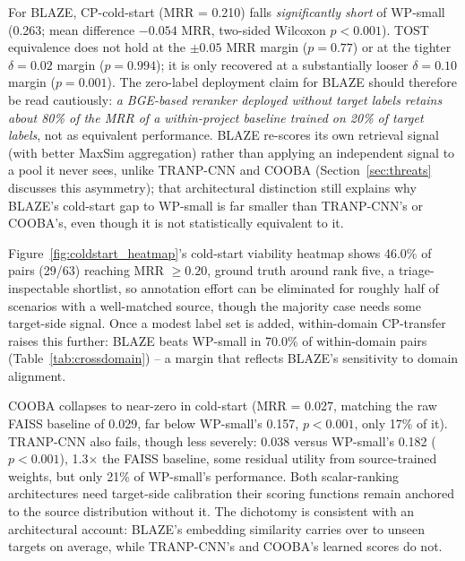 \documentclass[a4paper,fleqn]{cas-dc}
\begin{document}
For BLAZE, CP-cold-start (MRR = 0.210) falls \emph{significantly short}
of WP-small (0.263; mean
difference $-0.054$ MRR, two-sided Wilcoxon $p < 0.001$). TOST equivalence
does not hold at the $\pm 0.05$ MRR margin ($p = 0.77$) or at the tighter $\delta = 0.02$ margin
($p = 0.994$); it is only recovered at a substantially looser
$\delta = 0.10$ margin ($p = 0.001$). The zero-label deployment claim for
BLAZE should therefore be read cautiously:
\emph{a BGE-based reranker deployed without
target labels retains about 80\% of the MRR of a within-project baseline
trained on 20\% of target labels}, not as equivalent performance. BLAZE re-scores
its own retrieval signal (with better MaxSim aggregation) rather than
applying an independent signal to a pool it never sees, unlike TRANP-CNN
and COOBA (Section~\ref{sec:threats} discusses this asymmetry); that
architectural distinction still explains why BLAZE's cold-start gap to
WP-small is far smaller than TRANP-CNN's or COOBA's, even though it is not
statistically equivalent to it.

 Figure~\ref{fig:coldstart_heatmap}'s cold-start viability heatmap shows
46.0\% of pairs (29/63) reaching MRR $\geq 0.20$, ground truth around rank
five, a triage-inspectable shortlist, so annotation effort can be
eliminated for roughly half of scenarios with a well-matched source, though
the majority case needs some target-side signal. Once a modest label
set is added, within-domain CP-transfer raises this further: BLAZE beats
WP-small in 70.0\% of within-domain pairs (Table~\ref{tab:crossdomain}) --
a margin that reflects BLAZE's sensitivity to domain alignment.

 COOBA collapses to near-zero in cold-start (MRR = 0.027,
matching the raw FAISS baseline of 0.029, far below WP-small's 0.157,
$p < 0.001$, only 17\% of it). TRANP-CNN also fails, though less severely: 0.038 versus
WP-small's 0.182 ($p < 0.001$), 1.3$\times$ the FAISS baseline, some
residual utility from source-trained weights, but only 21\% of WP-small's
performance. Both scalar-ranking architectures need target-side calibration
their scoring functions remain anchored to the source distribution without
it. The dichotomy is consistent with an architectural account: BLAZE's
embedding similarity carries over to unseen targets on average, while
TRANP-CNN's and COOBA's learned scores do not.
\end{document}

